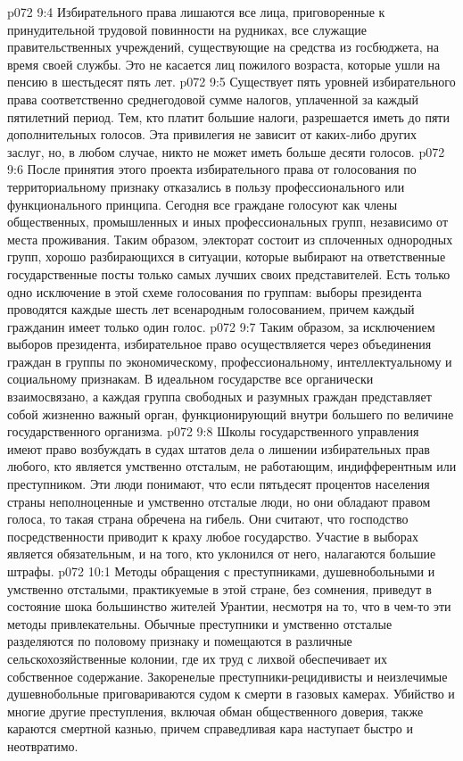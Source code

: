 \vs p072 9:4 \pc {}\bibnobreakspace Избирательного права лишаются все лица, приговоренные к принудительной трудовой повинности на рудниках, все служащие правительственных учреждений, существующие на средства из госбюджета, на время своей службы. Это не касается лиц пожилого возраста, которые ушли на пенсию в шестьдесят пять лет.
\vs p072 9:5 \pc {}\bibnobreakspace Существует пять уровней избирательного права соответственно среднегодовой сумме налогов, уплаченной за каждый пятилетний период. Тем, кто платит большие налоги, разрешается иметь до пяти дополнительных голосов. Эта привилегия не зависит от каких\hyp{}либо других заслуг, но, в любом случае, никто не может иметь больше десяти голосов.
\vs p072 9:6 \pc {}\bibnobreakspace После принятия этого проекта избирательного права от голосования по территориальному признаку отказались в пользу профессионального или функционального принципа. Сегодня все граждане голосуют как члены общественных, промышленных и иных профессиональных групп, независимо от места проживания. Таким образом, электорат состоит из сплоченных однородных групп, хорошо разбирающихся в ситуации, которые выбирают на ответственные государственные посты только самых лучших своих представителей. Есть только одно исключение в этой схеме голосования по группам: выборы президента проводятся каждые шесть лет всенародным голосованием, причем каждый гражданин имеет только один голос.
\vs p072 9:7 \pc Таким образом, за исключением выборов президента, избирательное право осуществляется через объединения граждан в группы по экономическому, профессиональному, интеллектуальному и социальному признакам. В идеальном государстве все органически взаимосвязано, а каждая группа свободных и разумных граждан представляет собой жизненно важный орган, функционирующий внутри большего по величине государственного организма.
\vs p072 9:8 Школы государственного управления имеют право возбуждать в судах штатов дела о лишении избирательных прав любого, кто является умственно отсталым, не работающим, индифферентным или преступником. Эти люди понимают, что если пятьдесят процентов населения страны неполноценные и умственно отсталые люди, но они обладают правом голоса, то такая страна обречена на гибель. Они считают, что господство посредственности приводит к краху любое государство. Участие в выборах является обязательным, и на того, кто уклонился от него, налагаются большие штрафы.
\vs p072 10:1 Методы обращения с преступниками, душевнобольными и умственно отсталыми, практикуемые в этой стране, без сомнения, приведут в состояние шока большинство жителей Урантии, несмотря на то, что в чем\hyp{}то эти методы привлекательны. Обычные преступники и умственно отсталые разделяются по половому признаку и помещаются в различные сельскохозяйственные колонии, где их труд с лихвой обеспечивает их собственное содержание. Закоренелые преступники\hyp{}рецидивисты и неизлечимые душевнобольные приговариваются судом к смерти в газовых камерах. Убийство и многие другие преступления, включая обман общественного доверия, также караются смертной казнью, причем справедливая кара наступает быстро и неотвратимо.
